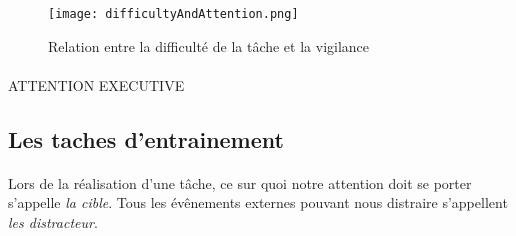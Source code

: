 \begin{figure}[h]
    \begin{center}
    \texttt{[image: difficultyAndAttention.png]}
    \end{center}
    \caption{Relation entre la difficulté de la tâche et la vigilance}
\label{DifficultyAndAttention}
\end{figure}

\paragraph{} ATTENTION EXECUTIVE


\newpage
\subsection{Les taches d'entrainement}
\label{TrainingSection}

\paragraph{}Lors de la réalisation d'une tâche, ce sur quoi notre attention doit se porter s'appelle \emph{la cible}. Tous les évênements externes pouvant nous distraire s'appellent
\emph{les distracteur}.



\newpage